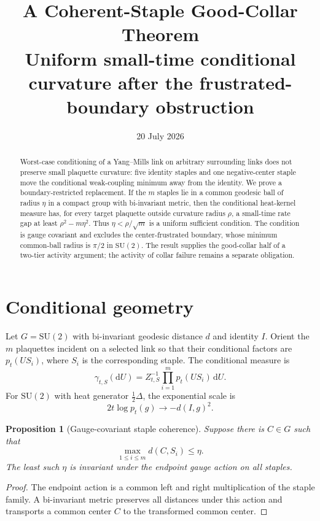 \documentclass[11pt]{article}
\title{A Coherent-Staple Good-Collar Theorem\\
\large Uniform small-time conditional curvature after the frustrated-boundary obstruction}
\author{}
\date{20 July 2026}
\newtheorem{proposition}[theorem]{Proposition}
\newcommand{\SU}{\mathrm{SU}(2)}
\newcommand{\dd}{\mathrm{d}}
\begin{document}
\maketitle

\begin{abstract}
Worst-case conditioning of a Yang--Mills link on arbitrary surrounding links
does not preserve small plaquette curvature: five identity staples and one
negative-center staple move the conditional weak-coupling minimum away from
the identity.  We prove a boundary-restricted replacement.  If the $m$
staples lie in a common geodesic ball of radius $\eta$ in a compact group with
bi-invariant metric, then the conditional heat-kernel measure has, for every
target plaquette outside curvature radius $\rho$, a small-time rate gap at
least $\rho^2-m\eta^2$.  Thus $\eta<\rho/\sqrt m$ is a uniform sufficient
condition.  The condition is gauge covariant and excludes the center-frustrated
boundary, whose minimum common-ball radius is $\pi/2$ in $\SU$.  The result
supplies the good-collar half of a two-tier activity argument; the activity of
collar failure remains a separate obligation.
\end{abstract}

\tableofcontents

\section{Conditional geometry}

Let $G=\SU$ with bi-invariant geodesic distance $d$ and identity $I$.  Orient
the $m$ plaquettes incident on a selected link so that their conditional
factors are $p_t(US_i)$, where $S_i$ is the corresponding staple.  The
conditional measure is
\begin{equation}
 \gamma_{t,S}(\dd U)=Z_{t,S}^{-1}\prod_{i=1}^{m}p_t(US_i)\,\dd U.
 \label{eq:conditional}
\end{equation}
For $\SU$ with heat generator $\tfrac12\Delta$, the exponential scale is
\begin{equation}
 2t\log p_t(g)\longrightarrow-d(I,g)^2.
 \label{eq:heat-rate}
\end{equation}

\begin{proposition}[Gauge-covariant staple coherence]
Suppose there is $C\in G$ such that
\begin{equation}
 \max_{1\leq i\leq m}d(C,S_i)\leq\eta.
 \label{eq:coherence}
\end{equation}
The least such $\eta$ is invariant under the endpoint gauge action on all
staples.
\end{proposition}
\begin{proof}
The endpoint action is a common left and right multiplication of the staple
family.  A bi-invariant metric preserves all distances under this action and
transports a common center $C$ to the transformed common center.
\end{proof}
\end{document}
